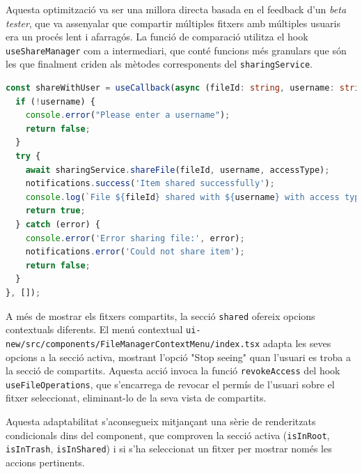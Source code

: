 Aquesta optimització va ser una millora directa basada en el feedback d'un \textit{beta tester}, que va assenyalar que compartir múltiples fitxers amb múltiples usuaris era un procés lent i afarragós. La funció de comparació utilitza el hook \texttt{useShareManager} com a intermediari, que conté funcions més granulars que són les que finalment criden als mètodes corresponents del \texttt{sharingService}.

\begin{lstlisting}[language=typescript, caption={Funció per compartir amb un usuari a `useShareManager.ts`}]
const shareWithUser = useCallback(async (fileId: string, username: string, accessType: 'READ' | 'WRITE' = 'READ') => {
  if (!username) {
    console.error("Please enter a username");
    return false;
  }
  try {
    await sharingService.shareFile(fileId, username, accessType);   
    notifications.success('Item shared successfully');
    console.log(`File ${fileId} shared with ${username} with access type ${accessType}`);
    return true;
  } catch (error) {
    console.error('Error sharing file:', error);
    notifications.error('Could not share item');
    return false;
  }
}, []);
\end{lstlisting}

A més de mostrar els fitxers compartits, la secció \texttt{shared} ofereix opcions contextuals diferents. El menú contextual \texttt{ui-new/src/components/FileManagerContextMenu/index.tsx} adapta les seves opcions a la secció activa, mostrant l'opció "Stop seeing" quan l'usuari es troba a la secció de compartits. Aquesta acció invoca la funció \texttt{revokeAccess} del hook \texttt{useFileOperations}, que s'encarrega de revocar el permís de l'usuari sobre el fitxer seleccionat, eliminant-lo de la seva vista de compartits.

Aquesta adaptabilitat s'aconsegueix mitjançant una sèrie de renderitzats condicionals dins del component, que comproven la secció activa (\texttt{isInRoot}, \texttt{isInTrash}, \texttt{isInShared}) i si s'ha seleccionat un fitxer per mostrar només les accions pertinents.


